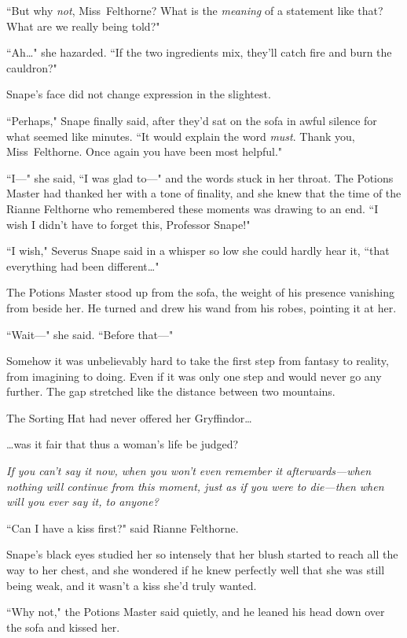 ``But why \emph{not}, Miss~Felthorne? What is the \emph{meaning} of a statement like that? What are we really being told?"

``Ah{\ldots}" she hazarded. ``If the two ingredients mix, they'll catch fire and burn the cauldron?"

Snape's face did not change expression in the slightest.

``Perhaps," Snape finally said, after they'd sat on the sofa in awful silence for what seemed like minutes. ``It would explain the word \emph{must}. Thank you, Miss~Felthorne. Once again you have been most helpful."

``I---" she said, ``I was glad to---" and the words stuck in her throat. The Potions Master had thanked her with a tone of finality, and she knew that the time of the Rianne Felthorne who remembered these moments was drawing to an end. ``I wish I didn't have to forget this, Professor Snape!"

``I wish," Severus Snape said in a whisper so low she could hardly hear it, ``that everything had been different{\ldots}"

The Potions Master stood up from the sofa, the weight of his presence vanishing from beside her. He turned and drew his wand from his robes, pointing it at her.

``Wait---" she said. ``Before that---"

Somehow it was unbelievably hard to take the first step from fantasy to reality, from imagining to doing. Even if it was only one step and would never go any further. The gap stretched like the distance between two mountains.

The Sorting Hat had never offered her Gryffindor{\ldots}

{\ldots}was it fair that thus a woman's life be judged?

\emph{If you can't say it now, when you won't even remember it afterwards---when nothing will continue from this moment, just as if you were to die---then when will you ever say it, to anyone?}

``Can I have a kiss first?" said Rianne Felthorne.

Snape's black eyes studied her so intensely that her blush started to reach all the way to her chest, and she wondered if he knew perfectly well that she was still being weak, and it wasn't a kiss she'd truly wanted.

``Why not," the Potions Master said quietly, and he leaned his head down over the sofa and kissed her.


